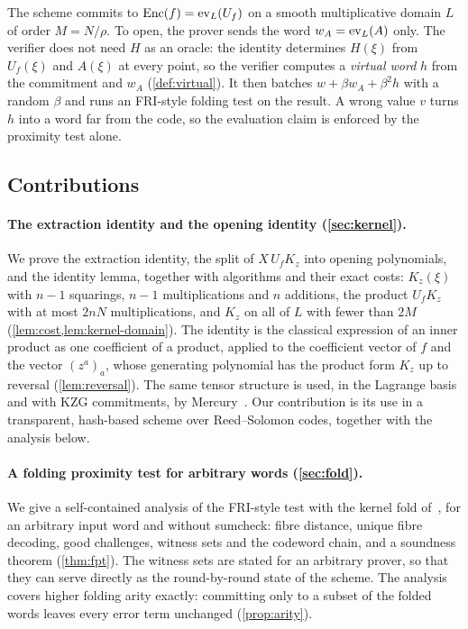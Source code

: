 The scheme commits to $\mathrm{Enc}(f) = \mathrm{ev}_L(U_f)$ on a smooth multiplicative domain $L$ of order $M = N/\rho$.
To open, the prover sends the word $w_A = \mathrm{ev}_L(A)$ only. The verifier does not need $H$ as an oracle: the identity determines $H(\xi)$ from $U_f(\xi)$ and $A(\xi)$ at every point, so the verifier computes a \emph{virtual word} $h$ from the commitment and $w_A$ (\cref{def:virtual}).
It then batches $w + \beta w_A + \beta^2 h$ with a random $\beta$ and runs an FRI-style folding test on the result.
A wrong value $v$ turns $h$ into a word far from the code, so the evaluation claim is enforced by the proximity test alone.

\subsection{Contributions}\label{sec:intro:contrib}

\paragraph{The extraction identity and the opening identity (\cref{sec:kernel}).}
We prove the extraction identity, the split of $X\,U_f K_z$ into opening polynomials, and the identity lemma, together with algorithms and their exact costs: $K_z(\xi)$ with $n-1$ squarings, $n-1$ multiplications and $n$ additions, the product $U_f K_z$ with at most $2nN$ multiplications, and $K_z$ on all of $L$ with fewer than $2M$ (\cref{lem:cost,lem:kernel-domain}).
The identity is the classical expression of an inner product as one coefficient of a product, applied to the coefficient vector of $f$ and the vector $(z^a)_a$, whose generating polynomial has the product form $K_z$ up to reversal (\cref{lem:reversal}). The same tensor structure is used, in the Lagrange basis and with KZG commitments, by Mercury~\cite{EG25}. Our contribution is its use in a transparent, hash-based scheme over Reed--Solomon codes, together with the analysis below.

\paragraph{A folding proximity test for arbitrary words (\cref{sec:fold}).}
We give a self-contained analysis of the FRI-style test with the kernel fold of~\cite{Mkh26}, for an arbitrary input word and without sumcheck: fibre distance, unique fibre decoding, good challenges, witness sets and the codeword chain, and a soundness theorem (\cref{thm:fpt}). The witness sets are stated for an arbitrary prover, so that they can serve directly as the round-by-round state of the scheme. The analysis covers higher folding arity exactly: committing only to a subset of the folded words leaves every error term unchanged (\cref{prop:arity}).

